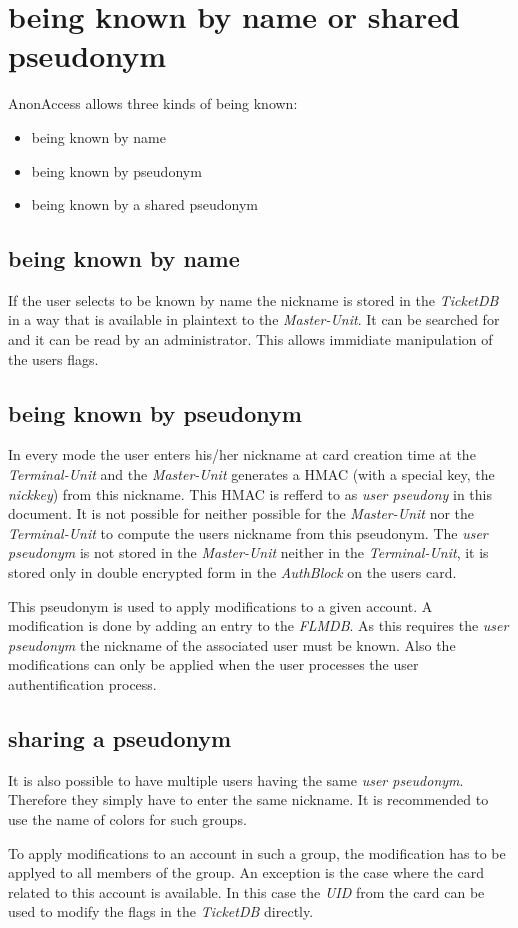 \section{being known by name or shared pseudonym}
AnonAccess allows three kinds of being known:
\begin{itemize}
\item being known by name
\item being known by pseudonym
\item being known by a shared pseudonym
\end{itemize}

\subsection{being known by name}
If the user selects to be known by name the nickname is stored in the \textit{TicketDB} in a way that is available in plaintext to the \textit{Master-Unit}. It can be searched for and it can be read by an administrator. This allows immidiate manipulation of the users flags.

\subsection{being known by pseudonym}
In every mode the user enters his/her nickname at card creation time at the \textit{Terminal-Unit} and the \textit{Master-Unit} generates a HMAC (with a special key, the \textit{nickkey}) from this nickname. This HMAC is refferd to as \textit{user pseudony} in this document. It is not possible for neither possible for the \textit{Master-Unit} nor the \textit{Terminal-Unit} to compute the users nickname from this pseudonym. The \textit{user pseudonym} is not stored in the \textit{Master-Unit} neither in the \textit{Terminal-Unit}, it is stored only in double encrypted form in the \textit{AuthBlock} on the users card.

This pseudonym is used to apply modifications to a given account. A modification is done by adding an entry to the \textit{FLMDB}. As this requires the \textit{user pseudonym} the nickname of the associated user must be known. Also the modifications can only be applied when the user processes the user authentification process.

\subsection{sharing a pseudonym}
It is also possible to have multiple users having the same \textit{user pseudonym}. Therefore they simply have to enter the same nickname. It is recommended to use the name of colors for such groups.

To apply modifications to an account in such a group, the modification has to be applyed to all members of the group. An exception is the case where the card related to this account is available. In this case the \textit{UID} from the card can be used to modify the flags in the \textit{TicketDB} directly.
